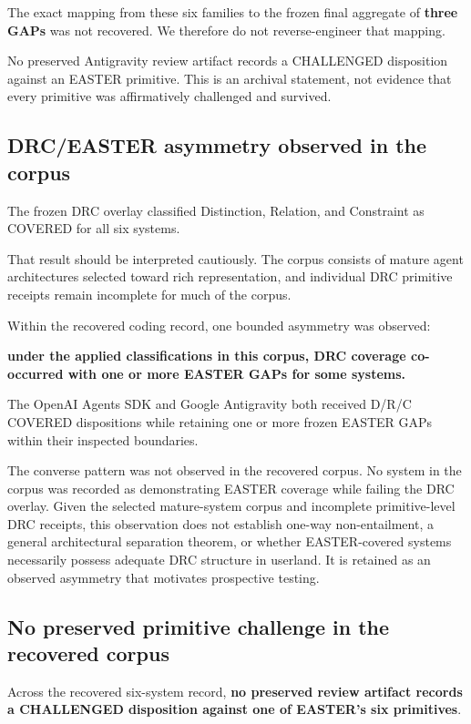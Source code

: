 \documentclass[11pt]{article}
\begin{document}
The exact mapping from these six families to the frozen final aggregate of \textbf{three GAPs} was not recovered. We therefore do not reverse-engineer that mapping.

No preserved Antigravity review artifact records a CHALLENGED disposition against an EASTER primitive. This is an archival statement, not evidence that every primitive was affirmatively challenged and survived.

\subsection{DRC/EASTER asymmetry observed in the corpus}

The frozen DRC overlay classified Distinction, Relation, and Constraint as COVERED for all six systems.

That result should be interpreted cautiously. The corpus consists of mature agent architectures selected toward rich representation, and individual DRC primitive receipts remain incomplete for much of the corpus.

Within the recovered coding record, one bounded asymmetry was observed:

\textbf{under the applied classifications in this corpus, DRC coverage co-occurred with one or more EASTER GAPs for some systems.}

The OpenAI Agents SDK and Google Antigravity both received D/R/C COVERED dispositions while retaining one or more frozen EASTER GAPs within their inspected boundaries.

The converse pattern was not observed in the recovered corpus. No system in the corpus was recorded as demonstrating EASTER coverage while failing the DRC overlay. Given the selected mature-system corpus and incomplete primitive-level DRC receipts, this observation does not establish one-way non-entailment, a general architectural separation theorem, or whether EASTER-covered systems necessarily possess adequate DRC structure in userland. It is retained as an observed asymmetry that motivates prospective testing.

\subsection{No preserved primitive challenge in the recovered corpus}

Across the recovered six-system record, \textbf{no preserved review artifact records a CHALLENGED disposition against one of EASTER's six primitives}.
\end{document}
